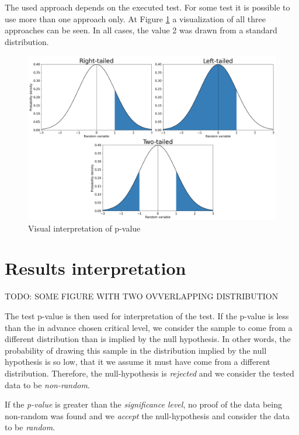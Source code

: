 \documentclass[
  digital,     %
  oneside,     %
  nosansbold,  %
  nocolorbold, %
  nolof,         %
  nolot,         %
]{fithesis4}
\begin{document}
The used approach depends on the executed test. For some test it is possible to use more than one approach only. At Figure \ref{fig:p_value} a visualization of all three approaches can be seen. In all cases, the value 2 was drawn from a standard distribution.

\begin{figure}
  \begin{center}
    \includegraphics[width=12.5cm]{figures/p-value.png}
  \end{center}
  \caption{Visual interpretation of p-value }
  \label{fig:p_value}
\end{figure}

\section{Results interpretation} \label{chap:rand-interpretation}
TODO: SOME FIGURE WITH TWO OVVERLAPPING DISTRIBUTION

The test p-value is then used for interpretation of the test. If the p-value is less than the in advance chosen critical level, we consider the sample to come from a different distribution than is implied by the null hypothesis. In other words, the probability of drawing this sample in the distribution implied by the null hypothesis is so low, that it  we assume it must have come from a different distribution. Therefore, the null-hypothesis is \emph{rejected} and we consider the tested data to be \emph{non-random}.

If the \emph{p-value} is greater than the \emph{significance level}, no proof of the data being non-random was found and we \emph{accept} the null-hypothesis and consider the data to be \emph{random}.
\end{document}

